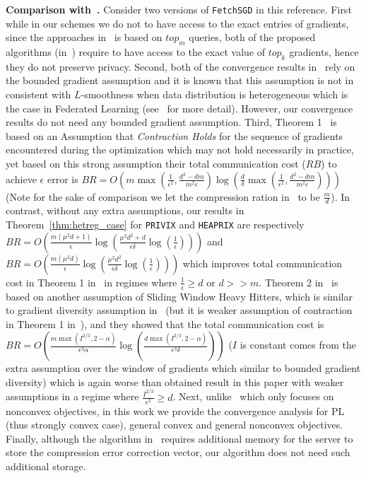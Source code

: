 \documentclass[twoside]{article}
\begin{document}
\vspace{0.1in}\noindent\textbf{Comparison with~\cite{rothchild2020fetchsgd}.}
Consider two versions of \texttt{FetchSGD} in this reference. First while in our schemes we do not to have access to the exact entries of gradients, since the approaches in~\cite{rothchild2020fetchsgd} is based on $top_m$ queries, both of the proposed algorithms (in~\cite{rothchild2020fetchsgd}) require to have access to the exact value of $top_k$ gradients, hence they do not preserve privacy. Second, both of the convergence results in~\cite{rothchild2020fetchsgd} rely on the bounded gradient assumption and it is known that this assumption is not in consistent with $L$-smoothness when data distribution is heterogeneous which is the case in Federated Learning (see~\cite{bayoumi2020tighter} for more detail). However, our convergence results do not need any bounded gradient assumption. Third, Theorem 1~\cite{rothchild2020fetchsgd} is based on an Assumption that \emph{Contraction Holds} for the sequence of gradients encountered during the optimization which may not hold necessarily in practice, yet based on this strong assumption their total communication cost ($RB$) to achieve $\epsilon$ error is  $BR=O\left(m\max(\frac{1}{\epsilon^2},\frac{d^2-dm}{m^2\epsilon})\log\left(\frac{d}{\delta}\max(\frac{1}{\epsilon^2},\frac{d^2-dm}{m^2\epsilon})\right)\right)$ (Note for the sake of comparison we let the compression ration in~\cite{rothchild2020fetchsgd} to be $\frac{m}{d}$). In contrast, without any extra assumptions, our results in Theorem~\ref{thm:hetreg_case} for \texttt{PRIVIX} and \texttt{HEAPRIX} are respectively $BR=O\left(\frac{m\left(\mu^2d+1\right)}{\epsilon}\log\left(\frac{\mu^2d^2+d}{\epsilon\delta}\log\left(\frac{1}{\epsilon}\right)\right)\right)$ and $BR=O\left(\frac{m\left(\mu^2d\right)}{\epsilon}\log\left(\frac{\mu^2d^2}{\epsilon\delta}\log\left(\frac{1}{\epsilon}\right)\right)\right)$ which improves total communication cost in Theorem 1 in~\cite{rothchild2020fetchsgd} in regimes where $\frac{1}{\epsilon}\geq d$ or $d>>m$. Theorem 2 in~\cite{rothchild2020fetchsgd} is based on another assumption of Sliding Window Heavy Hitters, which is similar to gradient diversity assumption in~\cite{li2018federated,haddadpour2019convergence} (but it is weaker assumption of contraction in Theorem 1 in~\cite{rothchild2020fetchsgd}), and they showed that the total communication cost is $BR=O\left(\frac{m\max(I^{2/3},2-\alpha)}{\epsilon^3\alpha}\log\left(\frac{d\max(I^{2/3},2-\alpha)}{\epsilon^3\delta}\right)\right)$ ($I$ is constant comes from the extra assumption over the window of gradients which similar to bounded gradient diversity) which is again worse than obtained result in this paper with weaker assumptions in a regime where $\frac{I^{2/3}}{\epsilon^2}\geq d$. Next, unlike~\cite{rothchild2020fetchsgd} which only focuses on nonconvex objectives, in this work we provide the convergence analysis for PL (thus strongly convex case), general convex and general nonconvex objectives. Finally, although the algorithm in~\cite{rothchild2020fetchsgd} requires additional memory for the server to store the compression error correction vector, our algorithm does not need such additional storage. \\     
\end{document}
